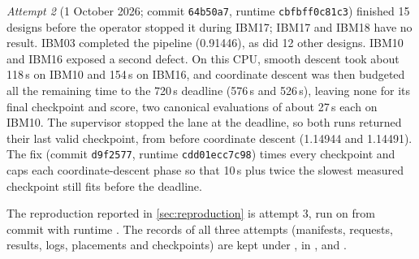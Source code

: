 \emph{Attempt 2} (1 October 2026; commit \texttt{64b50a7}, runtime
\texttt{cbfbff0c81c3}) finished 15 designs before the operator stopped it during
IBM17; IBM17 and IBM18 have no result. IBM03 completed the pipeline (0.91446), as did
12 other designs. IBM10 and IBM16 exposed a second defect. On this CPU, smooth descent
took about 118\,s on IBM10 and 154\,s on IBM16, and coordinate descent was then
budgeted all the remaining time to the 720\,s deadline (576\,s and 526\,s), leaving
none for its final checkpoint and score, two canonical evaluations of about 27\,s each
on IBM10. The supervisor stopped the lane at the deadline, so both runs returned
their last valid checkpoint, from before coordinate descent (1.14944 and 1.14491).
The fix (commit \texttt{d9f2577}, runtime \texttt{cdd01ecc7c98}) times every
checkpoint and caps each coordinate-descent phase so that 10\,s plus twice the slowest
measured checkpoint still fits before the deadline.

The reproduction reported in \cref{sec:reproduction} is attempt 3, run on
\ReproDate{} from commit \texttt{\ReproCommit} with runtime \texttt{\ReproRuntimeId}.
The records of all three attempts (manifests, requests, results, logs, placements and
checkpoints) are kept under , in
,  and
.
